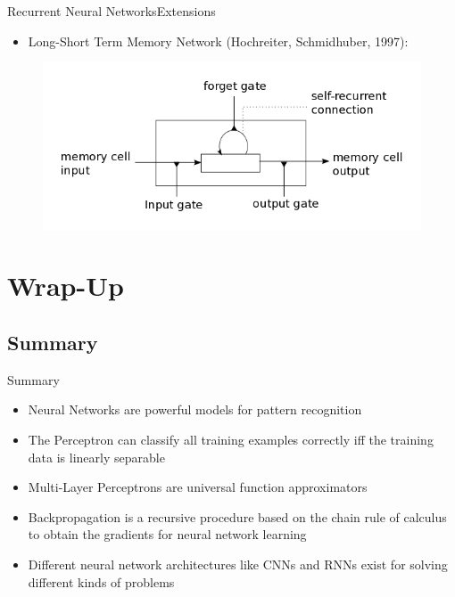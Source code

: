 \begin{frame}{Recurrent Neural Networks}{Extensions}
	\begin{itemize}
		\item Long-Short Term Memory Network (Hochreiter, Schmidhuber, 1997):
	\end{itemize}
	\begin{figure}
		\centering
		\includegraphics[scale=0.50]{10_deep_learning/02_img/lstm}
	\end{figure}
\end{frame}


\section{Wrap-Up}

\subsection{Summary}

\begin{frame}{Summary}{}
	\begin{itemize}
		\item Neural Networks are powerful models for pattern recognition
		\item The Perceptron can classify all training examples correctly iff the training data is linearly separable
		\item Multi-Layer Perceptrons are universal function approximators
		\item Backpropagation is a recursive procedure based on the chain rule of calculus to obtain the gradients for neural network learning
		\item Different neural network architectures like CNNs and RNNs exist for solving different kinds of problems
	\end{itemize}
\end{frame}


